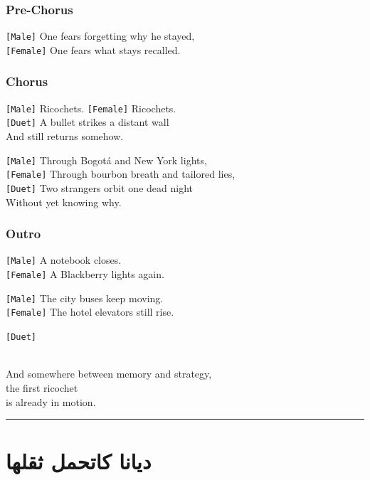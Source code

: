\documentclass[]{article}
\begin{document}
\subsubsection{Pre-Chorus}\label{pre-chorus-38}

\texttt{{[}Male{]}} One fears forgetting why he stayed,\\
\texttt{{[}Female{]}} One fears what stays recalled.

\subsubsection{Chorus}\label{chorus-66}

\texttt{{[}Male{]}} Ricochets. \texttt{{[}Female{]}} Ricochets.\\
\texttt{{[}Duet{]}} A bullet strikes a distant wall\\
And still returns somehow.

\texttt{{[}Male{]}} Through Bogotá and New York lights,\\
\texttt{{[}Female{]}} Through bourbon breath and tailored lies,\\
\texttt{{[}Duet{]}} Two strangers orbit one dead night\\
Without yet knowing why.

\subsubsection{Outro}\label{outro-12}

\texttt{{[}Male{]}} A notebook closes.\\
\texttt{{[}Female{]}} A Blackberry lights again.

\texttt{{[}Male{]}} The city buses keep moving.\\
\texttt{{[}Female{]}} The hotel elevators still rise.

\texttt{{[}Duet{]}}\strut \\
And somewhere between memory and strategy,\\
the first ricochet\\
is already in motion.

\begin{center}\rule{0.5\linewidth}{0.5pt}\end{center}

\section{\texorpdfstring{\arabicfont ديانا كاتحمل ثقلها}{Diana Kathmil Tqlha}}
\end{document}
